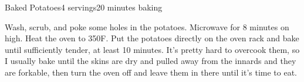 \documentclass[../Cookbook.tex]{subfiles}
\begin{document}
\begin{recipe}[BakedPotato]{Baked Potatoes}{4 servings}{20 minutes baking}

  Wash, scrub, and poke some holes in the potatoes.
  Microwave for 8 minutes on high. Heat the oven to 350\0F.
  Put the potatoes directly on the oven rack and bake until sufficiently tender, at least 10 minutes. It's pretty hard to overcook them, so I usually bake until the skins are dry and pulled away from the innards and they are forkable, then turn the oven off and leave them in there until it's time to eat.

\end{recipe}
\end{document}
